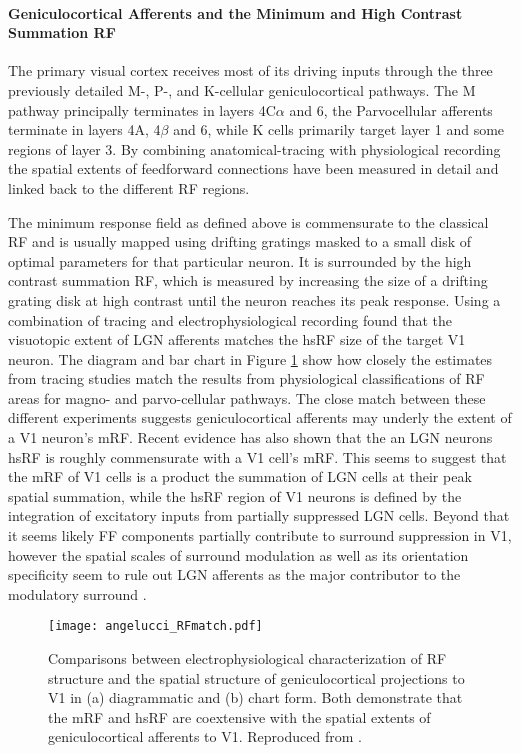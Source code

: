 \paragraph{Geniculocortical Afferents and the Minimum and High Contrast Summation RF} \label{AfferentBackground}

The primary visual cortex receives most of its driving inputs through
the three previously detailed M-, P-, and K-cellular geniculocortical
pathways. The M pathway principally terminates in layers 4C$\alpha$
and 6, the Parvocellular afferents terminate in layers 4A, 4$\beta$
and 6, while K cells primarily target layer 1 and some regions of
layer 3. By combining anatomical-tracing with physiological
recording the spatial extents of feedforward connections have been
measured in detail and linked back to the different RF regions.

The minimum response field as defined above is commensurate to the
classical RF and is usually mapped using drifting gratings masked to a
small disk of optimal parameters for that particular neuron. It is
surrounded by the high contrast summation RF, which is measured by
increasing the size of a drifting grating disk at high contrast until
the neuron reaches its peak response. Using a combination of tracing
and electrophysiological recording \citep{Angelucci2006a} found that
the visuotopic extent of LGN afferents matches the hsRF size of the
target V1 neuron. The diagram and bar chart in Figure \ref{FFmatch}
show how closely the estimates from tracing studies match the results
from physiological classifications of RF areas for magno- and
parvo-cellular pathways. The close match between these different
experiments suggests geniculocortical afferents may underly the extent
of a V1 neuron's mRF. Recent evidence has also shown that the an LGN
neurons hsRF is roughly commensurate with a V1 cell's mRF. This seems
to suggest that the mRF of V1 cells is a product the summation of LGN
cells at their peak spatial summation, while the hsRF region of V1
neurons is defined by the integration of excitatory inputs from
partially suppressed LGN cells. Beyond that it seems likely FF
components partially contribute to surround suppression in V1, however
the spatial scales of surround modulation as well as its orientation
specificity seem to rule out LGN afferents as the major contributor to
the modulatory surround \citep{Angelucci2002,Angelucci2006a}.

\begin{figure}
	\centering
        \texttt{[image: angelucci\_RFmatch.pdf]}
	\caption[Comparison between anatomical and electrophysiological
      estimates of V1 receptive field extents. Reproduced from
      \cite{Angelucci2006}.]{Comparisons between electrophysiological
      characterization of RF structure and the spatial structure of
      geniculocortical projections to V1 in (a) diagrammatic and (b)
      chart form. Both demonstrate that the mRF and hsRF are
      coextensive with the spatial extents of geniculocortical
      afferents to V1. Reproduced from \cite{Angelucci2006}.}
	\label{FFmatch}
\end{figure}

